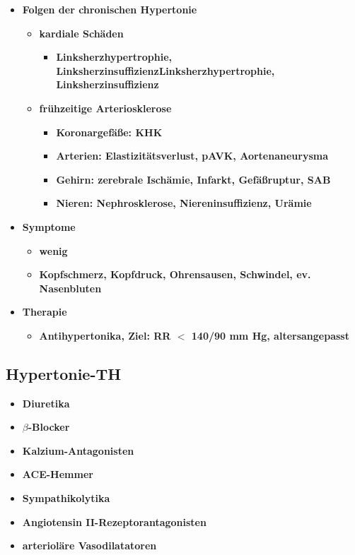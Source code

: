 \begin{itemize}
\begin{itemize}
					\item \textbf{Folgen der chronischen Hypertonie}
						\begin{itemize}
							\item \textbf{kardiale Schäden}
								\begin{itemize}
									\item \textbf{Linksherzhypertrophie, LinksherzinsuffizienzLinksherzhypertrophie, Linksherzinsuffizienz}
								\end{itemize}
							\item \textbf{frühzeitige Arteriosklerose}
								\begin{itemize}
									\item \textbf{Koronargefäße: KHK}
									\item \textbf{Arterien: Elastizitätsverlust, pAVK, Aortenaneurysma}
									\item \textbf{Gehirn: zerebrale Ischämie, Infarkt, Gefäßruptur, SAB}
									\item \textbf{Nieren: Nephrosklerose, Niereninsuffizienz, Urämie}
								\end{itemize}
						\end{itemize}
					\item \textbf{Symptome}
						\begin{itemize}
							\item \textbf{wenig}
							\item \textbf{Kopfschmerz, Kopfdruck, Ohrensausen, Schwindel, ev. Nasenbluten}
						\end{itemize}
					\item \textbf{Therapie}
						\begin{itemize}
							\item \textbf{Antihypertonika, Ziel: RR $<$ 140/90 mm Hg, altersangepasst}
						\end{itemize}
				\end{itemize}
		\end{itemize}
	\subsection*{Hypertonie-TH}
		\begin{itemize}
			\item \textbf{Diuretika}
			\item \textbf{$\beta$-Blocker}
			\item \textbf{Kalzium-Antagonisten}
			\item \textbf{ACE-Hemmer}
			\item \textbf{Sympathikolytika}
			\item \textbf{Angiotensin II-Rezeptorantagonisten}
			\item \textbf{arterioläre Vasodilatatoren}
		\end{itemize}
